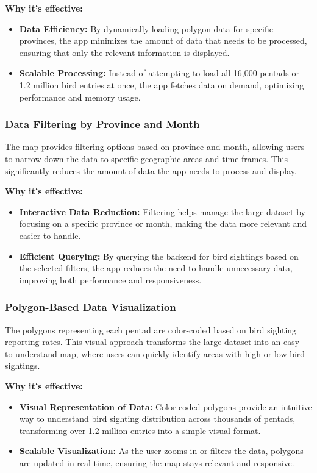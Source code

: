 \documentclass{article}
\begin{document}
\textbf{Why it's effective:}
\begin{itemize}
    \item \textbf{Data Efficiency:} By dynamically loading polygon data for specific provinces, the app minimizes the amount of data that needs to be processed, ensuring that only the relevant information is displayed.
    \item \textbf{Scalable Processing:} Instead of attempting to load all 16,000 pentads or 1.2 million bird entries at once, the app fetches data on demand, optimizing performance and memory usage.
\end{itemize}

\subsubsection{Data Filtering by Province and Month}
The map provides filtering options based on province and month, allowing users to narrow down the data to specific geographic areas and time frames. This significantly reduces the amount of data the app needs to process and display.

\textbf{Why it's effective:}
\begin{itemize}
    \item \textbf{Interactive Data Reduction:} Filtering helps manage the large dataset by focusing on a specific province or month, making the data more relevant and easier to handle.
    \item \textbf{Efficient Querying:} By querying the backend for bird sightings based on the selected filters, the app reduces the need to handle unnecessary data, improving both performance and responsiveness.
\end{itemize}

\subsubsection{Polygon-Based Data Visualization}
The polygons representing each pentad are color-coded based on bird sighting reporting rates. This visual approach transforms the large dataset into an easy-to-understand map, where users can quickly identify areas with high or low bird sightings.

\textbf{Why it's effective:}
\begin{itemize}
    \item \textbf{Visual Representation of Data:} Color-coded polygons provide an intuitive way to understand bird sighting distribution across thousands of pentads, transforming over 1.2 million entries into a simple visual format.
    \item \textbf{Scalable Visualization:} As the user zooms in or filters the data, polygons are updated in real-time, ensuring the map stays relevant and responsive.
\end{itemize}
\end{document}
